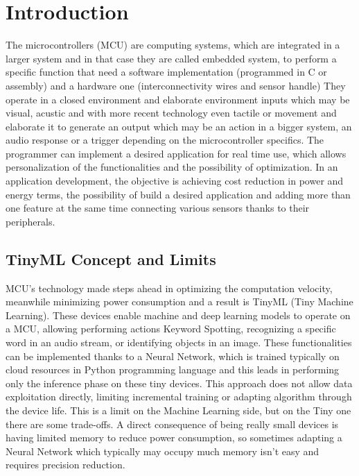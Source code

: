 \chapter{Introduction}
\label{cha:intro}
The microcontrollers (MCU) are computing systems, which are integrated in a larger system and in that case they are called embedded system, to perform a specific function that need a software implementation (programmed in C or assembly) and a hardware one (interconnectivity wires and sensor handle)
They operate in a closed environment and elaborate environment inputs which may be visual, acustic and with more recent technology even tactile or movement and elaborate it to generate an output which may be an action in a bigger system, an audio response or a trigger depending on the microcontroller specifics. 
The programmer can implement a desired application for real time use, which allows personalization of the functionalities and the possibility of optimization. In an application development, the objective is achieving cost reduction in power and energy terms, the possibility of build a desired application and adding more than one feature at the same time connecting various sensors thanks to their peripherals.    
\section{TinyML Concept and Limits}
\label{sec:context}                                                                      
MCU's technology made steps ahead in optimizing the computation velocity, meanwhile minimizing power consumption and a result is TinyML (Tiny Machine Learning). These devices enable machine and deep learning models to operate on a MCU, allowing performing actions Keyword Spotting, recognizing a specific word in an audio stream, or identifying objects in an image.
These functionalities can be implemented thanks to a Neural Network, which is trained typically on cloud resources in Python programming language and this leads in performing only the inference phase on these tiny devices. This approach does not allow data exploitation directly, limiting incremental training or adapting algorithm through the device life. This is a limit on the Machine Learning side, but on the Tiny one there are some trade-offs. A direct consequence of being really small devices is having limited memory to reduce power consumption, so sometimes adapting a Neural Network which typically may occupy much memory isn't easy and requires precision reduction. 
